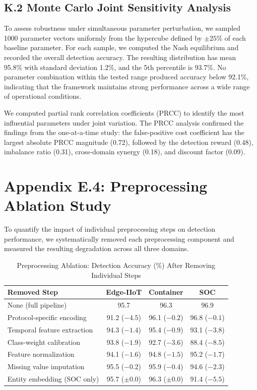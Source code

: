 \documentclass[12pt,a4paper]{article}
\theoremstyle{definition}
\begin{document}
{\subsection{K.2 Monte Carlo Joint Sensitivity Analysis}

To assess robustness under simultaneous parameter perturbation, we sampled 1000 parameter vectors uniformly from the hypercube defined by $\pm 25\%$ of each baseline parameter. For each sample, we computed the Nash equilibrium and recorded the overall detection accuracy. The resulting distribution has mean 95.8\% with standard deviation 1.2\%, and the 5th percentile is 93.7\%. No parameter combination within the tested range produced accuracy below 92.1\%, indicating that the framework maintains strong performance across a wide range of operational conditions.

We computed partial rank correlation coefficients (PRCC) to identify the most influential parameters under joint variation. The PRCC analysis confirmed the findings from the one-at-a-time study: the false-positive cost coefficient has the largest absolute PRCC magnitude (0.72), followed by the detection reward (0.48), imbalance ratio (0.31), cross-domain synergy (0.18), and discount factor (0.09).

\section{Appendix E.4: Preprocessing Ablation Study}
\label{sec:preprocess_ablation}

To quantify the impact of individual preprocessing steps on detection performance, we systematically removed each preprocessing component and measured the resulting degradation across all three domains.

\begin{table}[H]
\centering
\caption{Preprocessing Ablation: Detection Accuracy (\%) After Removing Individual Steps}
\label{tab:preprocess_ablation}
\small
\begin{tabular}{lccc}
\toprule
\textbf{Removed Step} & \textbf{Edge-IIoT} & \textbf{Container} & \textbf{SOC} \\
\midrule
None (full pipeline) & 95.7 & 96.3 & 96.9 \\
Protocol-specific encoding & 91.2 ($-4.5$) & 96.1 ($-0.2$) & 96.8 ($-0.1$) \\
Temporal feature extraction & 94.3 ($-1.4$) & 95.4 ($-0.9$) & 93.1 ($-3.8$) \\
Class-weight calibration & 93.8 ($-1.9$) & 92.7 ($-3.6$) & 88.4 ($-8.5$) \\
Feature normalization & 94.1 ($-1.6$) & 94.8 ($-1.5$) & 95.2 ($-1.7$) \\
Missing value imputation & 95.5 ($-0.2$) & 95.9 ($-0.4$) & 94.6 ($-2.3$) \\
Entity embedding (SOC only) & 95.7 ($\pm 0.0$) & 96.3 ($\pm 0.0$) & 91.4 ($-5.5$) \\
\bottomrule
\end{tabular}
\end{table}

}
\end{document}
